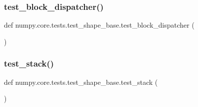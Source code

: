 \subsubsection{\texorpdfstring{test\+\_\+block\+\_\+dispatcher()}{test\_block\_dispatcher()}}
{\footnotesize\ttfamily def numpy.\+core.\+tests.\+test\+\_\+shape\+\_\+base.\+test\+\_\+block\+\_\+dispatcher (\begin{DoxyParamCaption}{ }\end{DoxyParamCaption})}

\mbox{\label{namespacenumpy_1_1core_1_1tests_1_1test__shape__base_ae3eb99e39fbbeb0a393c9965c291db95}} 
\subsubsection{\texorpdfstring{test\+\_\+stack()}{test\_stack()}}
{\footnotesize\ttfamily def numpy.\+core.\+tests.\+test\+\_\+shape\+\_\+base.\+test\+\_\+stack (\begin{DoxyParamCaption}{ }\end{DoxyParamCaption})}

